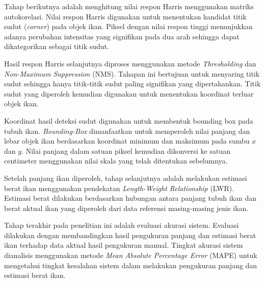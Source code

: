 Tahap berikutnya adalah menghitung nilai respon Harris menggunakan matriks autokorelasi. 
Nilai respon Harris digunakan untuk menentukan kandidat titik sudut (\emph{corner}) pada objek ikan. 
Piksel dengan nilai respon tinggi menunjukkan adanya perubahan intensitas yang signifikan pada dua arah sehingga dapat dikategorikan sebagai titik sudut.

Hasil respon Harris selanjutnya diproses menggunakan metode \emph{Thresholding} dan \emph{Non-Maximum Suppression} (NMS). 
Tahapan ini bertujuan untuk menyaring titik sudut sehingga hanya titik-titik sudut paling signifikan yang dipertahankan. 
Titik sudut yang diperoleh kemudian digunakan untuk menentukan koordinat terluar objek ikan.

Koordinat hasil deteksi sudut digunakan untuk membentuk bounding box pada tubuh ikan. 
\emph{Bounding-Box} dimanfaatkan untuk memperoleh nilai panjang dan lebar objek ikan berdasarkan koordinat minimum dan maksimum pada sumbu \(x\) dan \(y\). 
Nilai panjang dalam satuan piksel kemudian dikonversi ke satuan centimeter menggunakan nilai skala yang telah ditentukan sebelumnya.

Setelah panjang ikan diperoleh, tahap selanjutnya adalah melakukan estimasi berat ikan menggunakan pendekatan \emph{Length-Weight Relationship} (LWR). 
Estimasi berat dilakukan berdasarkan hubungan antara panjang tubuh ikan dan berat aktual ikan yang diperoleh dari data referensi masing-masing jenis ikan.

Tahap terakhir pada penelitian ini adalah evaluasi akurasi sistem. 
Evaluasi dilakukan dengan membandingkan hasil pengukuran panjang dan estimasi berat ikan terhadap data aktual hasil pengukuran manual. 
Tingkat akurasi sistem dianalisis menggunakan metode \emph{Mean Absolute Percentage Error} (MAPE) untuk mengetahui tingkat kesalahan sistem dalam melakukan pengukuran panjang dan estimasi berat ikan.



